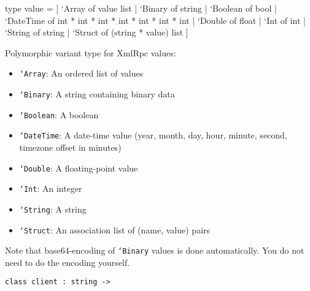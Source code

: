 \documentclass[11pt]{article}
\begin{document}
\label{type:XmlRpc.value}\begin{ocamldoccode}
type value = [ `Array of value list
  | `Binary of string
  | `Boolean of bool
  | `DateTime of int * int * int * int * int * int * int
  | `Double of float
  | `Int of int
  | `String of string
  | `Struct of (string * value) list ] 
\end{ocamldoccode}
\begin{ocamldocdescription}
Polymorphic variant type for XmlRpc values:\begin{itemize}
\item {\tt{`Array}}: An ordered list of values
\item {\tt{`Binary}}: A string containing binary data
\item {\tt{`Boolean}}: A boolean
\item {\tt{`DateTime}}: A date-time value
      (year, month, day, hour, minute, second, timezone offset in minutes)
\item {\tt{`Double}}: A floating-point value
\item {\tt{`Int}}: An integer
\item {\tt{`String}}: A string
\item {\tt{`Struct}}: An association list of (name, value) pairs
\end{itemize}

    Note that base64-encoding of {\tt{`Binary}} values is done automatically.
    You do not need to do the encoding yourself.


\end{ocamldocdescription}




\begin{ocamldoccode}
{\tt{class client : }}{\tt{string -> }}\end{ocamldoccode}
\label{class:XmlRpc.client}
\end{document}
